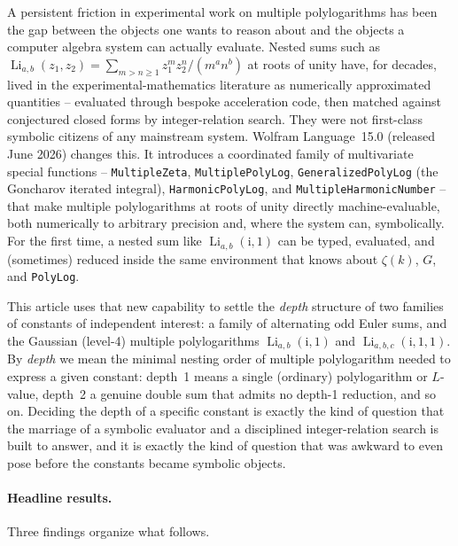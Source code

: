 \documentclass[11pt]{article}
\DeclareMathOperator{\Li}{Li}
\newcommand{\iu}{\mathrm{i}}
\theoremstyle{plain}
\theoremstyle{remark}
\begin{document}
A persistent friction in experimental work on multiple polylogarithms has been the gap between the objects one wants to reason about and the objects a computer algebra system can actually evaluate. Nested sums such as $\Li_{a,b}(z_1,z_2)=\sum_{m>n\ge1} z_1^m z_2^n/(m^a n^b)$ at roots of unity have, for decades, lived in the experimental-mathematics literature as numerically approximated quantities -- evaluated through bespoke acceleration code, then matched against conjectured closed forms by integer-relation search. They were not first-class symbolic citizens of any mainstream system. Wolfram Language~15.0 (released June 2026) changes this. It introduces a coordinated family of multivariate special functions -- \texttt{MultipleZeta}, \texttt{MultiplePolyLog}, \texttt{GeneralizedPolyLog} (the Goncharov iterated integral), \texttt{HarmonicPolyLog}, and \texttt{MultipleHarmonicNumber} -- that make multiple polylogarithms at roots of unity directly machine-evaluable, both numerically to arbitrary precision and, where the system can, symbolically. For the first time, a nested sum like $\Li_{a,b}(\iu,1)$ can be typed, evaluated, and (sometimes) reduced inside the same environment that knows about $\zeta(k)$, $G$, and \texttt{PolyLog}.

This article uses that new capability to settle the \emph{depth} structure of two families of constants of independent interest: a family of alternating odd Euler sums, and the Gaussian (level-4) multiple polylogarithms $\Li_{a,b}(\iu,1)$ and $\Li_{a,b,c}(\iu,1,1)$. By \emph{depth} we mean the minimal nesting order of multiple polylogarithm needed to express a given constant: depth~1 means a single (ordinary) polylogarithm or $L$-value, depth~2 a genuine double sum that admits no depth-1 reduction, and so on. Deciding the depth of a specific constant is exactly the kind of question that the marriage of a symbolic evaluator and a disciplined integer-relation search is built to answer, and it is exactly the kind of question that was awkward to even pose before the constants became symbolic objects.

\paragraph{Headline results.} Three findings organize what follows.
\end{document}
